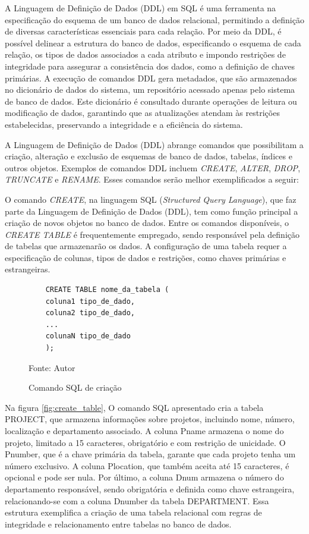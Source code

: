 A Linguagem de Definição de Dados (DDL) em SQL é uma ferramenta na especificação do esquema de um banco de dados relacional, permitindo a definição de diversas características essenciais para cada relação. Por meio da DDL, é possível delinear a estrutura do banco de dados, especificando o esquema de cada relação, os tipos de dados associados a cada atributo e impondo restrições de integridade para assegurar a consistência dos dados, como a definição de chaves primárias. A execução de comandos DDL gera metadados, que são armazenados no dicionário de dados do sistema, um repositório acessado apenas pelo sistema de banco de dados. Este dicionário é consultado durante operações de leitura ou modificação de dados, garantindo que as atualizações atendam às restrições estabelecidas, preservando a integridade e a eficiência do sistema.\cite{silberschatz2011database}

A Linguagem de Definição de Dados (DDL) abrange comandos que possibilitam a criação, alteração e exclusão de esquemas de banco de dados, tabelas, índices e outros objetos. Exemplos de comandos DDL incluem \textit{CREATE}, \textit{ALTER}, \textit{DROP}, \textit{TRUNCATE} e \textit{RENAME}. Esses comandos serão melhor exemplificados a seguir:


O comando \textit{CREATE}, na linguagem SQL (\textit{Structured Query Language}), que faz parte da Linguagem de Definição de Dados (DDL), tem como função principal a criação de novos objetos no banco de dados. Entre os comandos disponíveis, o \textit{CREATE TABLE} é frequentemente empregado, sendo responsável pela definição de tabelas que armazenarão os dados. A configuração de uma tabela requer a especificação de colunas, tipos de dados e restrições, como chaves primárias e estrangeiras\cite{silberschatz2011database}.

\begin{figure}[H]
    \centering
    \begin{lstlisting}
    CREATE TABLE nome_da_tabela (
    coluna1 tipo_de_dado,
    coluna2 tipo_de_dado,
    ...
    colunaN tipo_de_dado
    );
        \end{lstlisting}
    \caption{Comando SQL de criação}
    Fonte: Autor
    \label{lst:sql_create}
\end{figure}


Na figura \ref{fig:create_table}, O comando SQL apresentado cria a tabela PROJECT, que armazena informações sobre projetos, incluindo nome, número, localização e departamento associado. A coluna Pname armazena o nome do projeto, limitado a 15 caracteres, obrigatório e com restrição de unicidade. O Pnumber, que é a chave primária da tabela, garante que cada projeto tenha um número exclusivo. A coluna Plocation, que também aceita até 15 caracteres, é opcional e pode ser nula. Por último, a coluna Dnum armazena o número do departamento responsável, sendo obrigatória e definida como chave estrangeira, relacionando-se com a coluna Dnumber da tabela DEPARTMENT. Essa estrutura exemplifica a criação de uma tabela relacional com regras de integridade e relacionamento entre tabelas no banco de dados.

